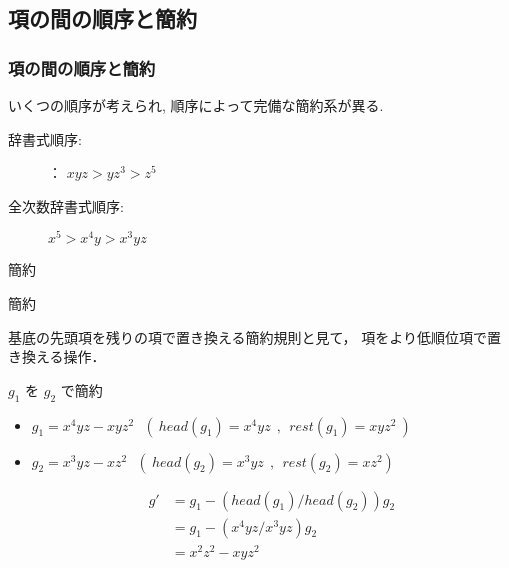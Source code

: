 \documentclass[dvipdfmx,11pt,notheorems]{beamer}
\theoremstyle{definition}
\begin{document}
\subsection{項の間の順序と簡約}
\begin{frame}\frametitle{項の間の順序と簡約}

いくつの順序が考えられ, 順序によって完備な簡約系が異る.

\begin{description}
\item [辞書式順序:]：   $xyz > yz^3 > z^5$ 
\item [全次数辞書式順序:]  $x^5 > x^4y > x^3yz$ 
\end{description}
\end{frame}

\begin{frame}{簡約}
\begin{block}{簡約}
 
基底の先頭項を残りの項で置き換える簡約規則と見て，
項をより低順位項で置き換える操作．
\end{block}

\begin{exampleblock}{$g_1$ を $g_2$ で簡約}
\begin{itemize}

\item $g_1 = x^4yz - xyz^2~~~(~head(g_1) = x^4yz~~,~~rest(g_1) = xyz^2~)~ $

\item $g_2 = x^3yz - xz^2~~~(~head(g_2) = x^3yz~~,~~rest(g_2) = xz^2)~ $

\[
\begin{array}{ll}
g' & = g_1 - ( head(g_1) / head(g_2) ) g_2 \\
   & = g_1 - ( x^4yz / x^3yz ) g_2 \\
   & = x^2z^2 - xyz^2
\end{array}
\]
\end{itemize}
\end{exampleblock}
\end{frame}
\end{document}
